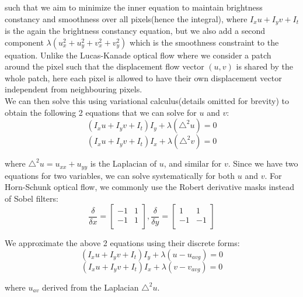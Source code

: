 \documentclass[12pt]{article}
\begin{document}
such that we aim to minimize the inner equation to maintain brightness constancy and smoothness over all pixels(hence the integral), where $I_xu + I_yv + I_t$ is the again the brightness constancy equation, but we also add a second component $\lambda (u_x^2 + u_y^2 + v_x^2 + v_y^2)$ which is the smoothness constraint to the equation. Unlike the Lucas-Kanade optical flow where we consider a patch around the pixel such that the displacement flow vector $(u, v)$ is shared by the whole patch, here each pixel is allowed to have their own displacement vector independent from neighbouring pixels.\\

We can then solve this using variational calculus(details omitted for brevity) to obtain the following 2 equations that we can solve for $u$ and $v$:
\begin{equation*}
(I_xu + I_yv + I_t)I_y + \lambda (\triangle^2 u) = 0
\end{equation*}
\begin{equation*}
(I_xu + I_yv + I_t)I_x + \lambda (\triangle^2 v) = 0
\end{equation*}

where $\triangle^2 u = u_{xx} + u_{yy}$ is the Laplacian of $u$, and similar for $v$. Since we have two equations for two variables, we can solve systematically for both $u$ and $v$. For Horn-Schunk optical flow, we commonly use the Robert derivative masks instead of Sobel filters: 
\begin{equation*}
\frac{\delta}{\delta x} = \begin{bmatrix}
-1 & 1\\
-1 & 1 \\
\end{bmatrix}, \frac{\delta}{\delta y} = \begin{bmatrix}
1 & 1\\
-1 & -1 \\
\end{bmatrix}
\end{equation*}

We approximate the above 2 equations using their discrete forms:
\begin{equation*}
(I_xu + I_yv + I_t)I_y + \lambda (u - u_{avg}) = 0
\end{equation*}
\begin{equation*}
(I_xu + I_yv + I_t)I_x + \lambda (v - v_{avg}) = 0
\end{equation*}

where $u_{av}$  derived from the Laplacian $\triangle^2 u$. 
\end{document}
